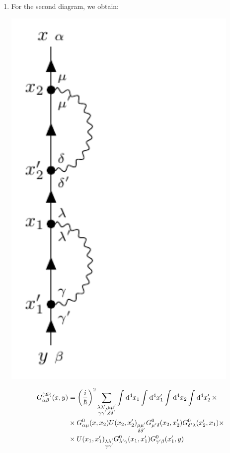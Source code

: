 \documentclass[11pt, a4paper, twoside, openright]{article}
\begin{document}
\begin{enumerate}[label=(\alph*)]
\item For the second diagram, we obtain:

\begin{minipage}[]{0.35\linewidth}
\centering
\includegraphics[width=0.9\textwidth]{images/B_label_c.pdf}
\label{}
\end{minipage}
\begin{minipage}[c]{0.65\linewidth}
\begin{equation}
\begin{split}
  G_{\alpha \beta }^{(2b)} (x,y) &= \qty(\frac{i}{\hbar })^2
   \sum_{\substack{\lambda \lambda', \mu \mu' \\ \gamma \gamma', \delta \delta'   } }^{} \int_{}^{} \dd[4]{x_1} \int_{}^{} \dd[4]{x_1'} \int_{}^{} \dd[4]{x_2} \int_{}^{} \dd[4]{x_2'} \times \\
  & \times G_{\alpha \mu }^0 (x,x_2) U(x_2,x_2')_{\substack{ \mu \mu' \\ \delta \delta'} } G^0_{\mu' \delta } (x_2,x_2') G^0_{\delta' \lambda } (x_2',x_1) \times \\
  & \times U(x_1,x_1')_{\substack{ \lambda \lambda' \\ \gamma \gamma'} }
  G^0_{\lambda' \gamma } (x_1,x_1') G^0_{\gamma' \beta } (x_1',y)
\end{split}
\end{equation}
\end{minipage}


\end{enumerate}
\end{document}
